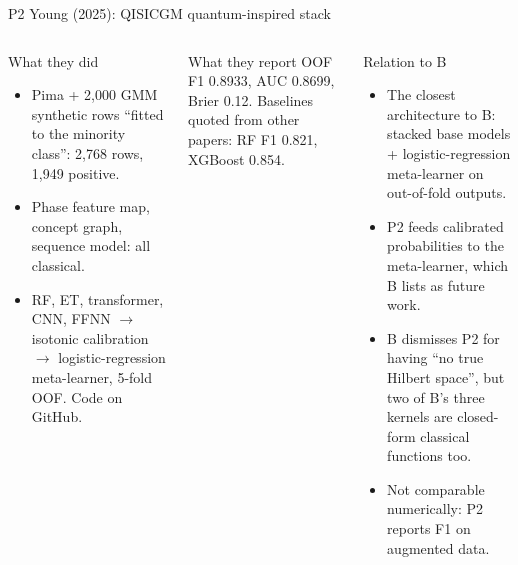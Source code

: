 \documentclass[aspectratio=169,10pt,t,xcolor={table}]{beamer}
\begin{document}
\begin{frame}{P2 \quad Young (2025): QISICGM quantum-inspired stack}
\begin{columns}[T]
\begin{block}{What they did}
\footnotesize
\begin{itemize}
  \item Pima + 2,000 GMM synthetic rows ``fitted to the minority class'': 2,768 rows, 1,949 positive.
  \item Phase feature map, concept graph, sequence model: all classical.
  \item RF, ET, transformer, CNN, FFNN $\to$ isotonic calibration $\to$ logistic-regression meta-learner, 5-fold OOF. Code on GitHub.
\end{itemize}
\end{block}
\begin{block}{What they report}
\footnotesize
OOF F1 0.8933, AUC 0.8699, Brier 0.12. Baselines quoted from other papers: RF F1 0.821, XGBoost 0.854.
\end{block}
\begin{exampleblock}{Relation to B}
\footnotesize
\begin{itemize}
  \item The closest architecture to B: stacked base models + logistic-regression meta-learner on out-of-fold outputs.
  \item P2 feeds calibrated probabilities to the meta-learner, which B lists as future work.
  \item B dismisses P2 for having ``no true Hilbert space'', but two of B's three kernels are closed-form classical functions too.
  \item Not comparable numerically: P2 reports F1 on augmented data.
\end{itemize}
\end{exampleblock}
\end{columns}
\end{frame}
\end{document}
